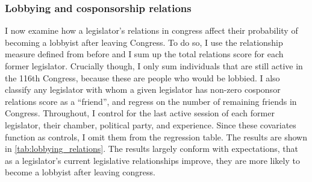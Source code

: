 \documentclass{article}
\begin{document}
  \subsubsection{Lobbying and cosponsorship relations}
  I now examine how a legislator's relations in congress affect their probability of becoming a lobbyist after leaving Congress. To do so, I use the relationship measure defined from before and I sum up the total relations score for each former legislator. Crucially though, I only sum individuals that are still active in the 116th Congress, because these are people who would be lobbied. I also classify any legislator with whom a given legislator has non-zero cosponsor relations score as a ``friend'', and regress on the number of remaining friends in Congress. Throughout, I control for the last active session of each former legislator, their chamber, political party, and experience. Since these covariates function as controls, I omit them from the regression table. The results are shown in \ref{tab:lobbying_relations}. The results largely conform with expectations, that as a legislator's current legislative relationships improve, they are more likely to become a lobbyist after leaving congress. 
\end{document}
